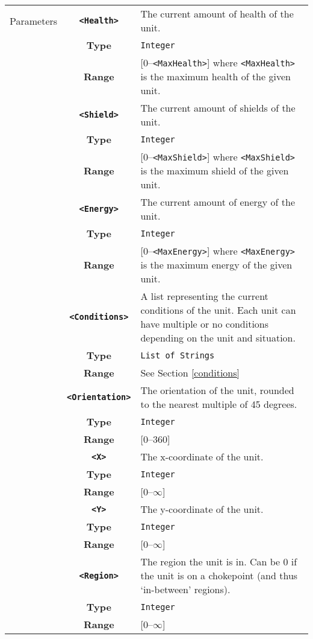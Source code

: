  \begin{tabularx}{\textwidth}{l | c | p{8cm}|}
 \cline{2-3}
 Parameters & \textbf{\verb|<Health>|} & The current amount of health of the unit.\\
            & \textbf{Type} & \verb|Integer| \\
            & \textbf{Range} & [0--\verb|<MaxHealth>|] where \verb|<MaxHealth>| is the maximum health of the given unit.\\
            \cline{2-3}
            & \textbf{\verb|<Shield>|} & The current amount of shields of the unit. \\
            & \textbf{Type} & \verb|Integer| \\
            & \textbf{Range} & [0--\verb|<MaxShield>|] where \verb|<MaxShield>| is the maximum shield of the given unit. \\
            \cline{2-3}
            & \textbf{\verb|<Energy>|} & The current amount of energy of the unit. \\
            & \textbf{Type} & \verb|Integer| \\
            & \textbf{Range} & [0--\verb|<MaxEnergy>|] where \verb|<MaxEnergy>| is the maximum energy of the given unit. \\
            \cline{2-3}
            & \textbf{\verb|<Conditions>|} & A list representing the current conditions of the unit. Each unit can have multiple or no conditions depending on the unit and situation.\\
            & \textbf{Type} & \verb|List of Strings| \\
            & \textbf{Range} & See Section \ref{conditions} \\
            \cline{2-3}
            & \textbf{\verb|<Orientation>|} & The orientation of the unit, rounded to the nearest multiple of 45 degrees. \\
            & \textbf{Type} & \verb|Integer| \\
            & \textbf{Range} & [0--360] \\
            \cline{2-3}
            & \textbf{\verb|<X>|} & The x-coordinate of the unit. \\
            & \textbf{Type} & \verb|Integer| \\
            &\textbf{Range} &  [0--$\infty$] \\
            \cline{2-3}
            & \textbf{\verb|<Y>|} & The y-coordinate of the unit. \\
            & \textbf{Type} & \verb|Integer| \\
            &\textbf{Range} & [0--$\infty$] \\
            \cline{2-3}
            & \textbf{\verb|<Region>|} & The region the unit is in. Can be 0 if the unit is on a chokepoint (and thus `in-between' regions).\\
            & \textbf{Type} & \verb|Integer| \\
            & \textbf{Range} & [0--$\infty$] \\
            \cline{2-3}
\end{tabularx}

